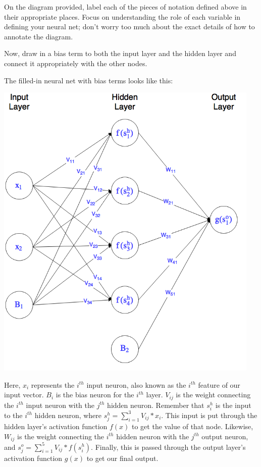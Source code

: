 \begin{Parts}

\Part
On the diagram provided, label each of the pieces of notation defined above in their appropriate places.
Focus on understanding the role of each variable in defining your neural net;
don't worry too much about the exact details of how to annotate the diagram.

Now, draw in a bias term to both the input layer and the hidden layer and connect it appropriately with the other nodes.

\begin{solution}
The filled-in neural net with bias terms looks like this:
\begin{center}
\includegraphics[width=5in]{src/problems/nn/small_neural_net_soln.png}
\end{center}
Here, $x_i$ represents the $i^{th}$ input neuron, also known as the $i^{th}$ feature of our input vector. $B_i$ is the bias neuron for the $i^{th}$ layer. $V_{ij}$ is the weight connecting the $i^{th}$ input neuron with the $j^{th}$ hidden neuron. Remember that $s_i^h$ is the input to the $i^{th}$ hidden neuron, where $s_j^h=\sum_{i=1}^{3}V_{ij}*x_i$. This input is put through the hidden layer's activation function $f(x)$ to get the value of that node. Likewise, $W_{ij}$ is the weight connecting the $i^{th}$ hidden neuron with the $j^{th}$ output neuron, and $s_j^o=\sum_{i=1}^{5}V_{ij}*f(s^h_i)$. Finally, this is passed through the output layer's activation function $g(x)$ to get our final output.



\end{solution}
\end{Parts}
